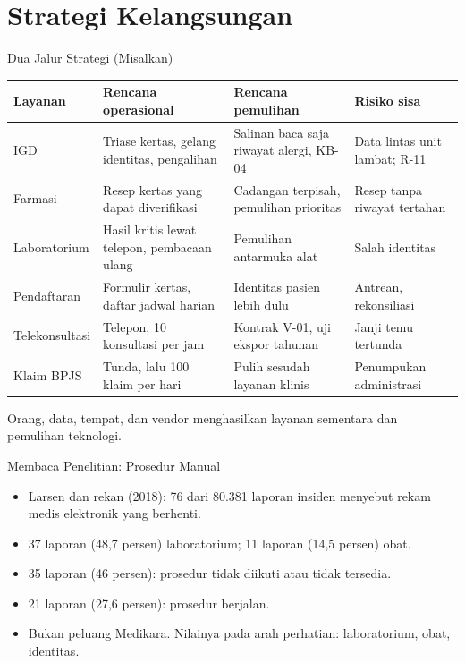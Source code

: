 \documentclass[aspectratio=169, table, 12pt]{beamer}
\begin{document}
\section{Strategi Kelangsungan}

\begin{frame}{{\Large Dua Jalur Strategi (Misalkan)}}
  \vspace{2pt}
  \scriptsize
  \begin{tabularx}{\textwidth}{|>{\raggedright\arraybackslash}p{}|>{\raggedright\arraybackslash}X|>{\raggedright\arraybackslash}X|>{\raggedright\arraybackslash}p{}|}
    \hline
    \textbf{Layanan} & \textbf{Rencana operasional} & \textbf{Rencana pemulihan} & \textbf{Risiko
    sisa} \\ \hline
    IGD & Triase kertas, gelang identitas, pengalihan & Salinan baca saja riwayat alergi, KB-04 &
    Data lintas unit lambat; R-11 \\ \hline
    Farmasi & Resep kertas yang dapat diverifikasi & Cadangan terpisah, pemulihan prioritas & Resep
    tanpa riwayat tertahan \\ \hline
    Laboratorium & Hasil kritis lewat telepon, pembacaan ulang & Pemulihan antarmuka alat & Salah
    identitas \\ \hline
    Pendaftaran & Formulir kertas, daftar jadwal harian & Identitas pasien lebih dulu & Antrean,
    rekonsiliasi \\ \hline
    Telekonsultasi & Telepon, 10 konsultasi per jam & Kontrak V-01, uji ekspor tahunan & Janji temu
    tertunda \\ \hline
    Klaim BPJS & Tunda, lalu 100 klaim per hari & Pulih sesudah layanan klinis & Penumpukan
    administrasi \\ \hline
  \end{tabularx}

  \vspace{6pt}
  \small Orang, data, tempat, dan vendor menghasilkan layanan sementara dan pemulihan teknologi.
\end{frame}

\begin{frame}{{\Large Membaca Penelitian: Prosedur Manual}}
  \vspace{6pt}
  \small
  \begin{itemize}
    \item Larsen dan rekan (2018): 76 dari 80.381 laporan insiden menyebut rekam medis elektronik
          yang berhenti.
    \item 37 laporan (48,7 persen) laboratorium; 11 laporan (14,5 persen) obat.
    \item 35 laporan (46 persen): prosedur tidak diikuti atau tidak tersedia.
    \item 21 laporan (27,6 persen): prosedur berjalan.
    \item Bukan peluang Medikara. Nilainya pada arah perhatian: laboratorium, obat, identitas.
  \end{itemize}
\end{frame}
\end{document}
